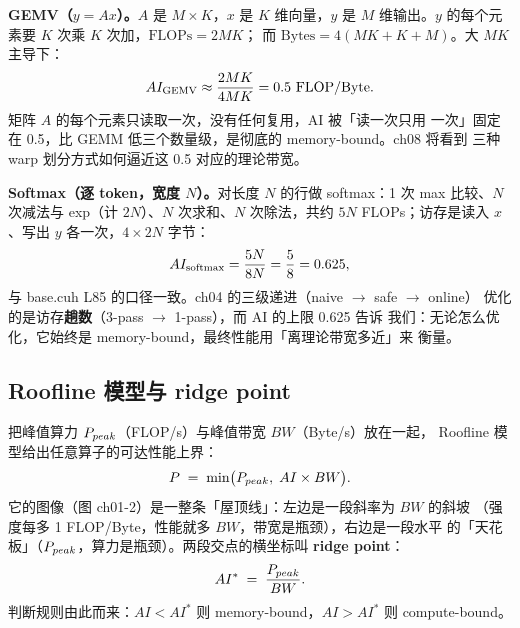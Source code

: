 \textbf{GEMV（$y = Ax$）。}$A$ 是 $M{\times}K$，$x$ 是 $K$ 维向量，$y$ 是
$M$ 维输出。$y$ 的每个元素要 $K$ 次乘 $K$ 次加，$\mathrm{FLOPs} = 2MK$；
而 $\mathrm{Bytes} = 4(MK + K + M)$。大 $MK$ 主导下：
\begin{equation}
  AI\sb{\mathrm{GEMV}} \approx \frac{2MK}{4MK} = 0.5 \ \mathrm{FLOP/Byte}.
\end{equation}
矩阵 $A$ 的每个元素只读取一次，没有任何复用，AI 被「读一次只用
一次」固定在 0.5，比 GEMM 低三个数量级，是彻底的 memory-bound。ch08 将看到
三种 warp 划分方式如何逼近这 0.5 对应的理论带宽。

\textbf{Softmax（逐 token，宽度 $N$）。}对长度 $N$ 的行做 softmax：1 次 max
比较、$N$ 次减法与 exp（计 $2N$）、$N$ 次求和、$N$ 次除法，共约 $5N$
FLOPs；访存是读入 $x$、写出 $y$ 各一次，$4 \times 2N$ 字节：
\begin{equation}
  AI\sb{\mathrm{softmax}} = \frac{5N}{8N} = \frac{5}{8} = 0.625,
\end{equation}
与 base.cuh L85 的口径一致。ch04 的三级递进（naive $\to$ safe $\to$ online）
优化的是访存\textbf{趟数}（3-pass $\to$ 1-pass），而 AI 的上限 0.625 告诉
我们：无论怎么优化，它始终是 memory-bound，最终性能用「离理论带宽多近」来
衡量。

\subsection{Roofline 模型与 ridge point}

把峰值算力 $P\sb{peak}$（FLOP/s）与峰值带宽 $BW$（Byte/s）放在一起，
Roofline 模型给出任意算子的可达性能上界：
\begin{equation}
  P \;=\; \min\bigl(P\sb{peak},\; AI \times BW\bigr).
  \label{eq:ch01-roofline}
\end{equation}
它的图像（图 ch01-2）是一整条「屋顶线」：左边是一段斜率为 $BW$ 的斜坡
（强度每多 1 FLOP/Byte，性能就多 $BW$，带宽是瓶颈），右边是一段水平
的「天花板」（$P\sb{peak}$，算力是瓶颈）。两段交点的横坐标叫
\textbf{ridge point}：
\begin{equation}
  AI^{*} \;=\; \frac{P\sb{peak}}{BW}.
  \label{eq:ch01-ridge}
\end{equation}
判断规则由此而来：$AI < AI^{*}$ 则 memory-bound，$AI > AI^{*}$ 则
compute-bound。

